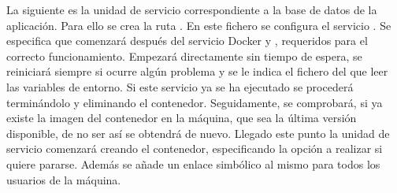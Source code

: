La siguiente es la unidad de servicio correspondiente a la base de datos de la aplicación. Para ello se crea la ruta . En este fichero se configura el servicio . Se especifica que comenzará después del servicio Docker y , requeridos para el correcto funcionamiento. Empezará directamente sin tiempo de espera, se reiniciará siempre si ocurre algún problema y se le indica el fichero del que leer las variables de entorno. Si este servicio ya se ha ejecutado se procederá terminándolo y eliminando el contenedor. Seguidamente, se comprobará, si ya existe la imagen del contenedor en la máquina, que sea la última versión disponible, de no ser así se obtendrá de nuevo. Llegado este punto la unidad de servicio comenzará creando el contenedor, especificando la opción a realizar si quiere pararse. Además se añade un enlace simbólico al mismo para todos los usuarios de la máquina. 

